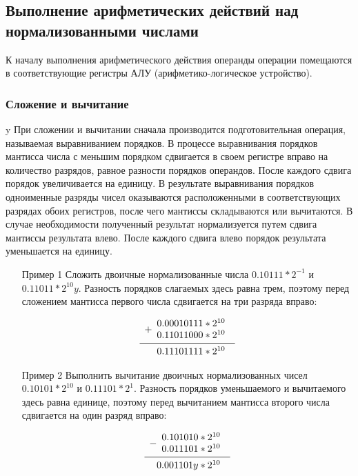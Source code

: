 \documentclass[a4paper]{article}
\begin{document}
\subsection{Выполнение арифметических действий над нормализованными числами}

К началу выполнения арифметического действия операнды операции помещаются в соответствующие регистры АЛУ (арифметико-логическое устройство).
\subsubsection{Сложение и вычитание}y
При сложении и вычитании сначала производится подготовительная операция, называемая выравниванием порядков. В процессе выравнивания порядков мантисса числа с меньшим порядком сдвигается в своем регистре вправо на количество разрядов, равное разности порядков операндов. После каждого сдвига порядок увеличивается на единицу. В результате выравнивания порядков одноименные разряды чисел оказываются расположенными в соответствующих разрядах обоих регистров, после чего мантиссы складываются или вычитаются. В случае необходимости полученный результат нормализуется путем сдвига мантиссы результата влево. После каждого сдвига влево порядок результата уменьшается на единицу.
\begin{itemize}
\item[Пример 1] Сложить двоичные нормализованные числа $0.10111 * 2^{-1}$ и $0.11011*2^{10}y$. Разность порядков слагаемых здесь равна трем, поэтому перед сложением мантисса первого числа сдвигается на три разряда вправо:

\[
\begin{array}{r}
+
\begin{array}{r}
0.00010111 * 2^{10}\\
0.11011000 * 2^{10}\\
\end{array} \\
\midrule
\begin{array}{r}
0.11101111 * 2^{10}
\end{array}
\end{array}
\]

\item[Пример 2] Выполнить вычитание двоичных нормализованных чисел $0.10101*2^{10}$ и $0.11101*2^{1}$. Разность порядков уменьшаемого и вычитаемого здесь равна единице, поэтому перед вычитанием мантисса второго числа сдвигается на один разряд вправо:

\[
\begin{array}{r}
-
\begin{array}{r}
0.101010 * 2^{10}\\
0.011101 * 2^{10}\\
\end{array} \\
\midrule
\begin{array}{r}
0.001101y * 2^{10}
\end{array}
\end{array}
\]


\end{itemize}
\end{document}
